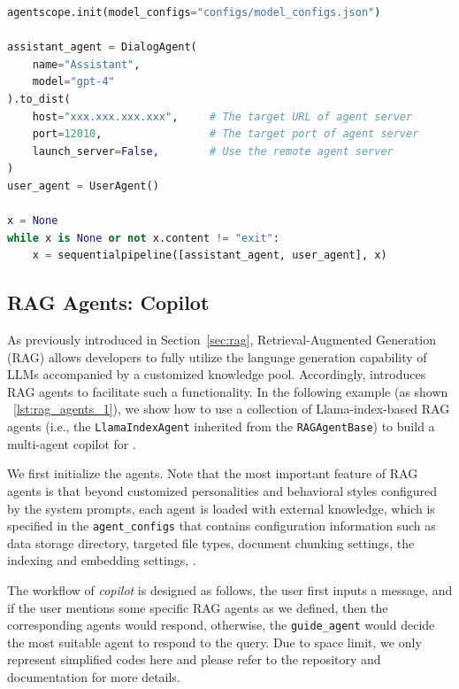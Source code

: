 \begin{lstlisting}[language=Python, caption={Example of setting sub-processes for agents in multi-machine multi-process mode.}, label={lst:multi_machine}, float=t]
agentscope.init(model_configs="configs/model_configs.json")
    
assistant_agent = DialogAgent(
    name="Assistant",
    model="gpt-4"
).to_dist(
    host="xxx.xxx.xxx.xxx",     # The target URL of agent server
    port=12010,                 # The target port of agent server
    launch_server=False,        # Use the remote agent server
)
user_agent = UserAgent()

x = None
while x is None or not x.content != "exit":
	x = sequentialpipeline([assistant_agent, user_agent], x)
\end{lstlisting}


\subsection{RAG Agents: \ours Copilot}\label{sec:copilot}

As previously introduced in Section~\ref{sec:rag}, Retrieval-Augmented Generation (RAG) allows developers to fully utilize the language generation capability of LLMs accompanied by a customized knowledge pool. Accordingly, \ours introduces RAG agents to facilitate such a functionality. In the following example (as shown \lstlistingname~\ref{lst:rag_agents_1}), we show how to use a collection of Llama-index-based RAG agents (i.e., the \texttt{LlamaIndexAgent} inherited from the \texttt{RAGAgentBase}) to build a multi-agent copilot for \ours.

We first initialize the agents. Note that the most important feature of RAG agents is that beyond customized personalities and behavioral styles configured by the system prompts, each agent is loaded with external knowledge, which is specified in the \texttt{agent\_configs} that contains configuration information such as data storage directory, targeted file types, document chunking settings, the indexing and embedding settings, \etc.

The workflow of \textit{copilot} is designed as follows, the user first inputs a message, and if the user mentions some specific RAG agents as we defined, then the corresponding agents would respond, otherwise, the \texttt{guide\_agent} would decide the most suitable agent to respond to the query. Due to space limit, we only represent simplified codes here and please refer to the repository and documentation for more details.

